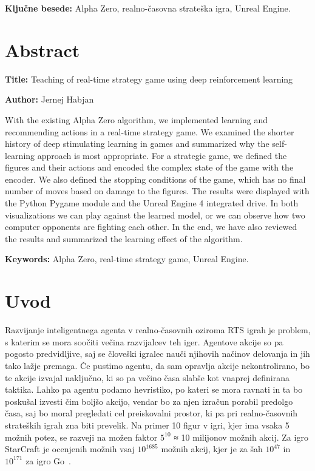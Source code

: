 \documentclass[a4paper, 12pt]{book}
\newcommand{\ttitleEn}{Teaching of real-time strategy game using deep reinforcement learning}
\newcommand{\tauthor}{Jernej Habjan}
\newcommand{\tkeywords}{Alpha Zero, realno-časovna strateška igra, Unreal Engine}
\newcommand{\tkeywordsEn}{Alpha Zero, real-time strategy game, Unreal Engine}
\newcommand{\clearemptydoublepage}{\newpage{\pagestyle{empty}\cleardoublepage}}
\begin{document}
\noindent\textbf{Ključne besede:} \tkeywords.
\clearemptydoublepage

\chapter*{Abstract}

\noindent\textbf{Title:} \ttitleEn
\bigskip

\noindent\textbf{Author:} \tauthor
\bigskip

\noindent With the existing Alpha Zero algorithm, we implemented learning and recommending actions in a real-time strategy game.
We examined the shorter history of deep stimulating learning in games and summarized why the self-learning approach is most appropriate.
For a strategic game, we defined the figures and their actions and encoded the complex state of the game with the encoder.
We also defined the stopping conditions of the game, which has no final number of moves based on damage to the figures.
The results were displayed with the Python Pygame module and the Unreal Engine 4 integrated drive.
In both visualizations we can play against the learned model, or we can observe how two computer opponents are fighting each other.
In the end, we have also reviewed the results and summarized the learning effect of the algorithm.
\bigskip

\noindent\textbf{Keywords:} \tkeywordsEn.
\clearemptydoublepage

\mainmatter
\setcounter{page}{1}
\pagestyle{fancy}

\chapter{Uvod}


Razvijanje inteligentnega agenta v realno-časovnih oziroma RTS igrah je problem, s katerim se mora soočiti večina razvijalcev teh iger. Agentove akcije so pa pogosto predvidljive, saj se človeški igralec nauči njihovih načinov delovanja in jih tako lažje premaga.
Če pustimo agentu, da sam opravlja akcije nekontrolirano, bo te akcije izvajal naključno, ki so pa večino časa slabše kot vnaprej definirana taktika.
Lahko pa agentu podamo hevristiko, po kateri se mora ravnati in ta bo poskušal izvesti čim boljšo akcijo, vendar bo za njen izračun porabil predolgo časa, saj bo moral pregledati cel preiskovalni prostor, ki pa pri realno-časovnih strateških igrah zna biti prevelik.
Na primer 10 figur v igri, kjer ima vsaka 5 možnih potez, se razveji na možen faktor $5^{10}$ ≈ 10 milijonov možnih akcij.
Za igro StarCraft je ocenjenih možnih vsaj $10^{1685}$ možnih akcij, kjer je za šah $10^{47}$ in $10^{171}$ za igro Go~\cite{ontanon2017combinatorial}.
\end{document}
